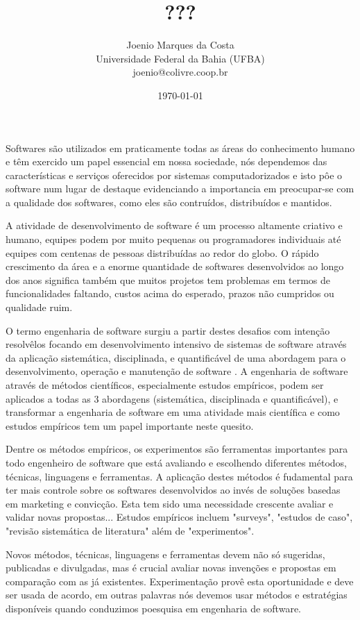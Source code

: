 \documentclass[12pt]{article}
\title{???
}
\author{Joenio Marques da Costa\\
  {\small Universidade Federal da Bahia (UFBA)} \\
  {\small joenio@colivre.coop.br}
}
\date{\today}
\begin{document}
\maketitle

Softwares são utilizados em praticamente todas as áreas do conhecimento humano
e têm exercido um papel essencial em nossa sociedade, nós dependemos das
características e serviços oferecidos por sistemas computadorizados
\cite{Mafra2006} e isto pôe o software num lugar de destaque evidenciando a
importancia em preocupar-se com a qualidade dos softwares, como eles são
contruídos, distribuídos e mantidos.

A atividade de desenvolvimento de software é um processo altamente criativo e
humano, equipes podem por muito pequenas ou programadores individuais até
equipes com centenas de pessoas distribuídas ao redor do globo. O rápido
crescimento da área e a enorme quantidade de softwares desenvolvidos ao longo
dos anos significa também que muitos projetos tem problemas em termos de
funcionalidades faltando, custos acima do esperado, prazos não cumpridos ou
qualidade ruim.

O termo engenharia de software surgiu a partir destes desafios com intenção
resolvêlos focando em desenvolvimento intensivo de sistemas de software
\cite{Wohlin2012} através da aplicação sistemática, disciplinada, e
quantificável de uma abordagem para o desenvolvimento, operação e manutenção
de software \cite{SWEBOK2014}. A engenharia de software através de métodos
científicos, especialmente estudos empíricos, podem ser aplicados a todas as 3
abordagens (sistemática, disciplinada e quantificável), e transformar a
engenharia de software em uma atividade mais científica e como estudos
empíricos tem um papel importante neste quesito.

Dentre os métodos empíricos, os experimentos são ferramentas importantes para
todo engenheiro de software que está avaliando e escolhendo diferentes
métodos, técnicas, linguagens e ferramentas. A aplicação destes métodos é
fudamental para ter mais controle sobre os softwares desenvolvidos ao invés de
soluções basedas em marketing e convicção. Esta tem sido uma necessidade
crescente avaliar e validar novas propostas... Estudos empíricos incluem
"surveys", "estudos de caso", "revisão sistemática de literatura" além de
"experimentos".

Novos métodos, técnicas, linguagens e ferramentas devem não só sugeridas,
publicadas e divulgadas, mas é crucial avaliar novas invenções e propostas em
comparação com as já existentes. Experimentação provê esta oportunidade e deve
ser usada de acordo, em outras palavras nós devemos usar métodos e estratégias
disponíveis quando conduzimos poesquisa em engenharia de software.
\end{document}
